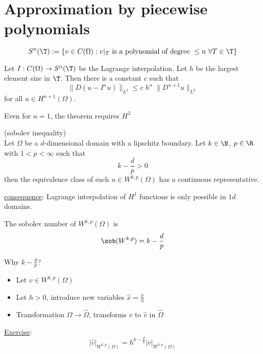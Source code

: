 \chapter{Approximation by piecewise polynomials}
\begin{equation*}
	S^n(\T):= \left\{ v \in C(\Omega): v|_{T} \text{ is a polynomial of degree } \leq n \ \forall T \in \T \right\}
\end{equation*}
\begin{theorem}
	Let $I: C(\Omega) \to S^n(\T)$ be the Lagrange interpolation. 
	Let $h$ be the largest element size in $\T$.
	Then there is a constant $c$ such that
	\begin{equation*}
		\|D(u-I^nu)\|_{L^{2}} \leq c\; h^n\; \|D^{n+1}u\|_{L^{2}}
	\end{equation*}
	for all $u \in H^{n+1}(\Omega)$.

	Even for  $n=1$, the theorem requires $H^2$
\end{theorem}
\begin{theorem}
	(sobolev inequality)\\
	Let $\Omega$ be a $d$-dimensional domain with a lipschitz boundary.
	Let $k \in \N$, $p \in \R$ with $1 < p < \infty$ such that 
	\begin{equation*}
		k-\frac{d}{p}>0
	\end{equation*}
	then the equivalence class of each $u \in W^{k,p}(\Omega)$ has a continuous representative.
\end{theorem}
\underline{consequence}: Lagrange interpolation of $H^1$ functions is only possible in $1d$ domains.
\begin{definition}
	The sobolev number of $W^{k,p}(\Omega)$ is 
	\begin{equation*}
		\sob(W^{k,p})= k - \frac{d}{p}
	\end{equation*}
\end{definition}
Why $k-\frac{d}{p}$?
\begin{itemize}
	\item Let $v \in W^{k,p}(\Omega)$
	\item Let $h > 0$, introduce new variables $\hat{x}= \frac{x}{h}$ 
	\item Transformation $\Omega \to \hat{\Omega}$, transforms $v$ to $\hat{v}$ in $\hat{\Omega}$
\end{itemize}
\underline{Exercise}: 
\begin{equation*}
	|\hat{v}|_{W^{k,p}(\Omega)} = h^{k-\frac{d}{p}} |v|_{W^{k,p}(\Omega)}
\end{equation*}
